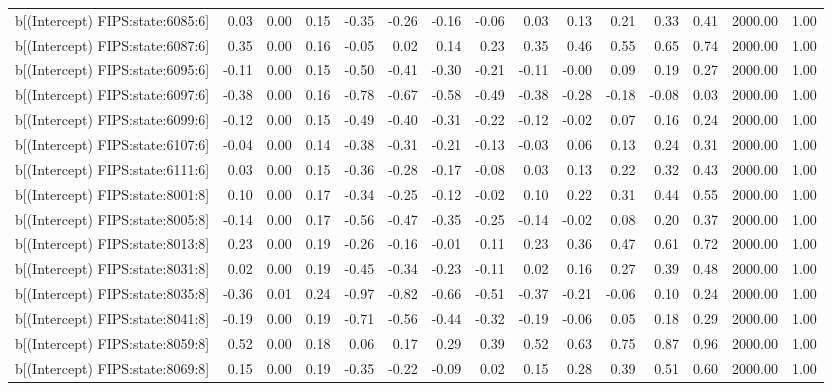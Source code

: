 \begin{table}[ht]
\begin{tabular}{rrrrrrrrrrrrrrr}
  b[(Intercept) FIPS:state:6085:6] & 0.03 & 0.00 & 0.15 & -0.35 & -0.26 & -0.16 & -0.06 & 0.03 & 0.13 & 0.21 & 0.33 & 0.41 & 2000.00 & 1.00 \\ 
  b[(Intercept) FIPS:state:6087:6] & 0.35 & 0.00 & 0.16 & -0.05 & 0.02 & 0.14 & 0.23 & 0.35 & 0.46 & 0.55 & 0.65 & 0.74 & 2000.00 & 1.00 \\ 
  b[(Intercept) FIPS:state:6095:6] & -0.11 & 0.00 & 0.15 & -0.50 & -0.41 & -0.30 & -0.21 & -0.11 & -0.00 & 0.09 & 0.19 & 0.27 & 2000.00 & 1.00 \\ 
  b[(Intercept) FIPS:state:6097:6] & -0.38 & 0.00 & 0.16 & -0.78 & -0.67 & -0.58 & -0.49 & -0.38 & -0.28 & -0.18 & -0.08 & 0.03 & 2000.00 & 1.00 \\ 
  b[(Intercept) FIPS:state:6099:6] & -0.12 & 0.00 & 0.15 & -0.49 & -0.40 & -0.31 & -0.22 & -0.12 & -0.02 & 0.07 & 0.16 & 0.24 & 2000.00 & 1.00 \\ 
  b[(Intercept) FIPS:state:6107:6] & -0.04 & 0.00 & 0.14 & -0.38 & -0.31 & -0.21 & -0.13 & -0.03 & 0.06 & 0.13 & 0.24 & 0.31 & 2000.00 & 1.00 \\ 
  b[(Intercept) FIPS:state:6111:6] & 0.03 & 0.00 & 0.15 & -0.36 & -0.28 & -0.17 & -0.08 & 0.03 & 0.13 & 0.22 & 0.32 & 0.43 & 2000.00 & 1.00 \\ 
  b[(Intercept) FIPS:state:8001:8] & 0.10 & 0.00 & 0.17 & -0.34 & -0.25 & -0.12 & -0.02 & 0.10 & 0.22 & 0.31 & 0.44 & 0.55 & 2000.00 & 1.00 \\ 
  b[(Intercept) FIPS:state:8005:8] & -0.14 & 0.00 & 0.17 & -0.56 & -0.47 & -0.35 & -0.25 & -0.14 & -0.02 & 0.08 & 0.20 & 0.37 & 2000.00 & 1.00 \\ 
  b[(Intercept) FIPS:state:8013:8] & 0.23 & 0.00 & 0.19 & -0.26 & -0.16 & -0.01 & 0.11 & 0.23 & 0.36 & 0.47 & 0.61 & 0.72 & 2000.00 & 1.00 \\ 
  b[(Intercept) FIPS:state:8031:8] & 0.02 & 0.00 & 0.19 & -0.45 & -0.34 & -0.23 & -0.11 & 0.02 & 0.16 & 0.27 & 0.39 & 0.48 & 2000.00 & 1.00 \\ 
  b[(Intercept) FIPS:state:8035:8] & -0.36 & 0.01 & 0.24 & -0.97 & -0.82 & -0.66 & -0.51 & -0.37 & -0.21 & -0.06 & 0.10 & 0.24 & 2000.00 & 1.00 \\ 
  b[(Intercept) FIPS:state:8041:8] & -0.19 & 0.00 & 0.19 & -0.71 & -0.56 & -0.44 & -0.32 & -0.19 & -0.06 & 0.05 & 0.18 & 0.29 & 2000.00 & 1.00 \\ 
  b[(Intercept) FIPS:state:8059:8] & 0.52 & 0.00 & 0.18 & 0.06 & 0.17 & 0.29 & 0.39 & 0.52 & 0.63 & 0.75 & 0.87 & 0.96 & 2000.00 & 1.00 \\ 
  b[(Intercept) FIPS:state:8069:8] & 0.15 & 0.00 & 0.19 & -0.35 & -0.22 & -0.09 & 0.02 & 0.15 & 0.28 & 0.39 & 0.51 & 0.60 & 2000.00 & 1.00 \\ 

\end{tabular}
\end{table}
